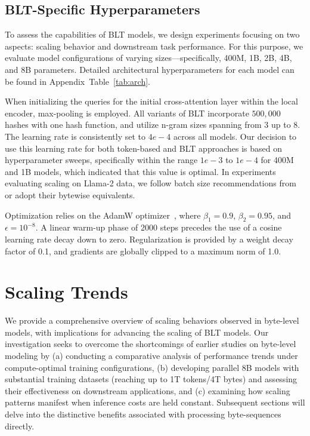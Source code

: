 \subsection{{\textsc BLT}-Specific Hyperparameters}

To assess the capabilities of {\textsc BLT} models, we design experiments focusing on two aspects: scaling behavior and downstream task performance. For this purpose, we evaluate model configurations of varying sizes—specifically, 400M, 1B, 2B, 4B, and 8B parameters. Detailed architectural hyperparameters for each model can be found in Appendix~Table~\ref{tab:arch}. 

When initializing the queries for the initial cross-attention layer within the local encoder, max-pooling is employed. All variants of {\textsc BLT} incorporate $500,000$ hashes with one hash function, and utilize n-gram sizes spanning from 3 up to 8. The learning rate is consistently set to $4e-4$ across all models. Our decision to use this learning rate for both token-based and {\textsc BLT} approaches is based on hyperparameter sweeps, specifically within the range $1e-3$ to $1e-4$ for 400M and 1B models, which indicated that this value is optimal. In experiments evaluating scaling on Llama-2 data, we follow batch size recommendations from~\cite{dubey2024llama} or adopt their bytewise equivalents. 

Optimization relies on the AdamW optimizer~\citep{adamw}, where $\beta_1 = 0.9$, $\beta_2 = 0.95$, and $\epsilon=10^{-8}$. A linear warm-up phase of 2000 steps precedes the use of a cosine learning rate decay down to zero. Regularization is provided by a weight decay factor of 0.1, and gradients are globally clipped to a maximum norm of 1.0.

\section{Scaling Trends}
\label{section:scaling}

We provide a comprehensive overview of scaling behaviors observed in byte-level models, with implications for advancing the scaling of {\textsc BLT} models. Our investigation seeks to overcome the shortcomings of earlier studies on byte-level modeling by (a) conducting a comparative analysis of performance trends under compute-optimal training configurations, (b) developing parallel 8B models with substantial training datasets (reaching up to 1T tokens/4T bytes) and assessing their effectiveness on downstream applications, and (c) examining how scaling patterns manifest when inference costs are held constant. Subsequent sections will delve into the distinctive benefits associated with processing byte-sequences directly.

